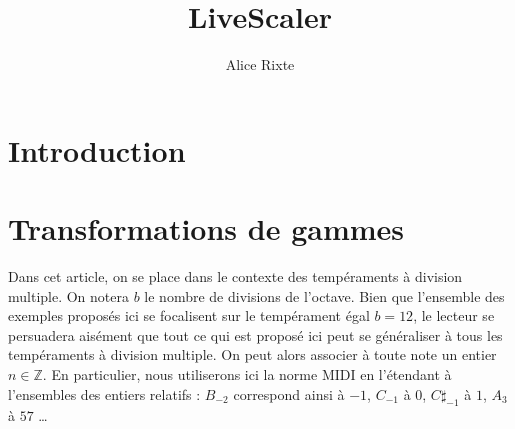 \documentclass[french,11pt]{article}
\title{LiveScaler}
\author{Alice Rixte}
\begin{document}
  

\maketitle

\tableofcontents

\section{Introduction}
\section{Transformations de gammes}

Dans cet article, on se place dans le contexte des tempéraments à division multiple. On notera $b$ le nombre de divisions de l'octave. Bien que l'ensemble des exemples proposés ici se focalisent sur le tempérament égal $b = 12$, le lecteur se persuadera aisément que tout ce qui est proposé ici peut se généraliser à tous les tempéraments à division multiple. On peut alors associer à toute note un entier $n\in \mathbb{Z}$. En particulier, nous utiliserons ici la norme MIDI en l'étendant à l'ensembles des entiers relatifs : $B_{-2}$ correspond ainsi à $-1$, $C_{-1}$ à $0$, $C\sharp_{-1}$  à $1$, $A_3$ à $57$ \dots
\end{document}
